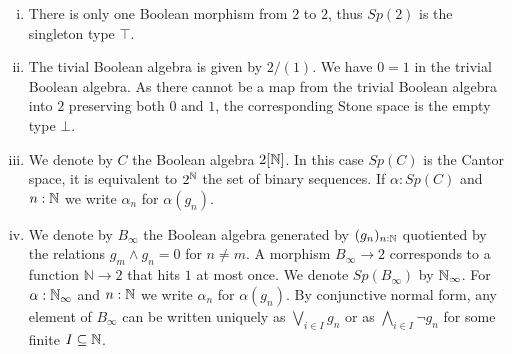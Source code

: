 \begin{example}
  \label{boolean-algebra-examples}
  \item 
  \begin{enumerate}[(i)]
  \item There is only one Boolean morphism from $2$ to $2$, thus $Sp(2)$ is the singleton type $\top$. 
  \item   
    The tivial Boolean algebra is given by $2/(1)$. 
    We have $0=1$ in the trivial Boolean algebra. 
    As there cannot be a map from the trivial Boolean algebra into $2$ preserving both $0$ and $1$, 
    the corresponding Stone space is the empty type $\bot$.
  \item\label{ExampleBAunderCantor}   
    We denote by $C$ the Boolean algebra $2[\mathbb{N}]$.
    In this case $Sp(C)$ is the Cantor space, it is equivalent to $2^{\mathbb{N}}$ the set of binary sequences. 
    If $\alpha:Sp(C)$ and $n:\mathbb{N}$ we write $\alpha_n $ for $\alpha(g_n)$. 
  \item\label{ExampleBAunderNinfty}
    We denote by $B_\infty$ the Boolean algebra generated by 
    $(g_n)_{n:\mathbb{N}}$ quotiented by the relations $g_m \wedge g_n = 0$ for ${n\neq m}$.
    A morphism $B_\infty\to 2$ corresponds to a function 
    $\mathbb N \to 2$ that hits $1$ at most once. 
    We denote $Sp(B_\infty)$ by $\mathbb{N}_{\infty}$. 
    For $\alpha:\mathbb{N}_{\infty}$ and $n:\mathbb{N}$ we write $\alpha_n$ for $\alpha(g_n)$. 
  By conjunctive normal form, 
  any element of $B_\infty$ can be written uniquely as 
  $\bigvee_{i\in I} g_n$ or as $\bigwedge_{i\in I} \neg g_n$ for some finite $I\subseteq \mathbb{N}$. 
  \end{enumerate}
\end{example}

